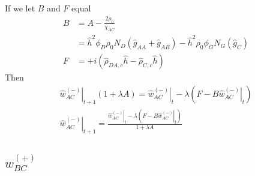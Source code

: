 \documentclass{article}
\begin{document}
  If we let $B$ and $F$ equal
  \begin{align*}
    B &= A - \frac{2\rho_0}{\chi_{AC}} \\
      &=\hat{h}^2 \phi_D \rho_0 N_D
        (\hat{g}_{AA} + \hat{g}_{AB}) 
        -  \hat{h} ^2  {\rho}_0  
          \phi_G N_G (\hat{g}_{C}) 
          \\
    F &= + i ( \hat{\rho}_{DA,c} \hat{h}
              - \hat{\rho}_{C,c} \hat{h} )
  \end{align*}
  Then
  \begin{align*}
    \left. \hat{w}_{AC}^{(-)} \right|_{t+1} ( 1 + \lambda A ) =
      \left. \hat{w}_{AC}^{(-)} \right|_t
      - \lambda \left( F - B \left. \hat{w}_{AC}^{(-)} \right|_t \right) \\
    \left. \hat{w}_{AC}^{(-)} \right|_{t+1} =
    \frac{\left. \hat{w}_{AC}^{(-)} \right|_t - \lambda
            \left( F - B \left. \hat{w}_{AC}^{(-)} \right|_t \right)}
         {1 + \lambda A}
  \end{align*}


  \subsection{$w_{BC}^{(+)}$}
\end{document}
